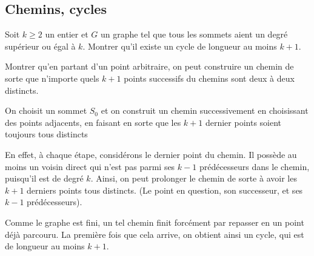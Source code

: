 \subsection*{Chemins, cycles}

\begin{exo}
\label{EXO:degmincycmin}
Soit $k\geq 2$ un entier et $G$ un graphe tel que tous les sommets aient un degré supérieur ou égal à $k$. Montrer qu'il existe un cycle de longueur au moins $k+1$.
\begin{hint} 
Montrer qu'en partant d'un point arbitraire, on peut construire un chemin de sorte que n'importe quels $k+1$ points successifs du chemins sont deux à deux distincts.
\end{hint}
\begin{sol}
On choisit un sommet $S_0$ et on construit un chemin successivement en choisissant des points adjacents, en faisant en sorte que les $k+1$ dernier points soient toujours tous distincts 

En effet, à chaque étape, considérons le dernier point du chemin. Il possède au moins un voisin direct qui n'est pas parmi ses $k-1$ prédécesseurs dans le chemin, puisqu'il est de degré $k$. Ainsi, on peut prolonger le chemin de sorte à avoir les $k+1$ derniers points tous distincts. (Le point en question, son successeur, et ses $k-1$ prédécesseurs).

Comme le graphe est fini, un tel chemin finit forcément par repasser en un point déjà parcouru. La première fois que cela arrive, on obtient ainsi un cycle, qui est de longueur au moins $k+1$.
\end{sol}
\end{exo}


